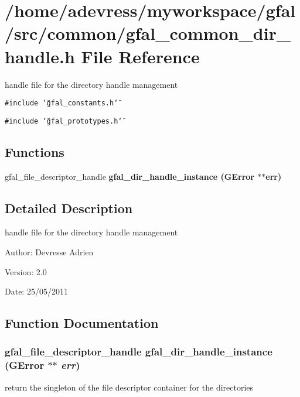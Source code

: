 \section{/home/adevress/myworkspace/gfal/src/common/gfal\_\-common\_\-dir\_\-handle.h File Reference}
\label{gfal__common__dir__handle_8h}
handle file for the directory handle management 

{\tt \#include \char`\"{}gfal\_\-constants.h\char`\"{}}\par
{\tt \#include \char`\"{}gfal\_\-prototypes.h\char`\"{}}\par
\subsection*{Functions}
\begin{CompactItemize}
\item 
gfal\_\-file\_\-descriptor\_\-handle \bf{gfal\_\-dir\_\-handle\_\-instance} (GError $\ast$$\ast$err)
\end{CompactItemize}


\subsection{Detailed Description}
handle file for the directory handle management 

\begin{Desc}
\item[Author:]Devresse Adrien \end{Desc}
\begin{Desc}
\item[Version:]2.0 \end{Desc}
\begin{Desc}
\item[Date:]25/05/2011 \end{Desc}


\subsection{Function Documentation}
\subsubsection{\setlength{\rightskip}{0pt plus 5cm}gfal\_\-file\_\-descriptor\_\-handle gfal\_\-dir\_\-handle\_\-instance (GError $\ast$$\ast$ {\em err})}\label{gfal__common__dir__handle_8h_c6a3e1ddffb475e5855442c9a0573bfc}


return the singleton of the file descriptor container for the directories 